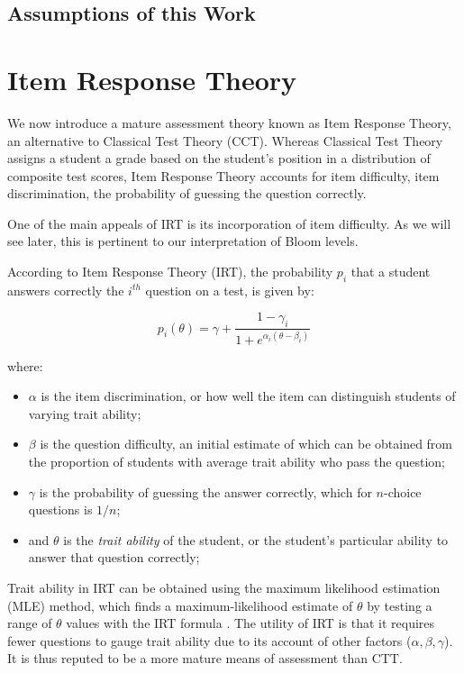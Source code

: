 \subsection{Assumptions of this Work}

\section{Item Response Theory}

We now introduce a mature assessment theory known as Item Response Theory, an
alternative to Classical Test Theory (CCT).  Whereas Classical Test Theory
assigns a student a grade based on the student's position in a distribution of
composite test scores, Item Response Theory accounts for item difficulty,
item discrimination, the probability of guessing the question correctly.

One of the main appeals of IRT is its incorporation of item difficulty.
As we will see later, this is pertinent to our interpretation of Bloom
levels.  

According to Item Response Theory (IRT), the probability $p_i$ that a student
answers correctly the $i^{th}$ question on a test, is given by:

\[
  p_i(\theta) = \gamma + \frac{1-\gamma_i}{1+e^{\alpha_i(\theta-\beta_i)}}
\]

where:

\begin{itemize} 

 \item $\alpha$ is the item discrimination, or how well the item can
 distinguish students of varying trait ability;

 \item $\beta$ is the question difficulty, an initial estimate of which can be
 obtained from the proportion of students with average trait ability who pass
 the question;

 \item $\gamma$ is the probability of guessing the answer correctly,
 which for $n$-choice questions is $1/n$;

 \item and $\theta$ is the \emph{trait ability} of the student, or the
 student's particular ability to answer that question correctly;

\end{itemize} 

Trait ability in IRT can be obtained using the maximum likelihood estimation
(MLE) method, which finds a maximum-likelihood estimate of $\theta$ by testing
a range of $\theta$ values with the IRT formula \cite{baker2004}.  The utility
of IRT is that it requires fewer questions to gauge trait ability due to its
account of other factors ($\alpha, \beta, \gamma$). It is thus reputed to be a
more mature means of assessment than CTT.

